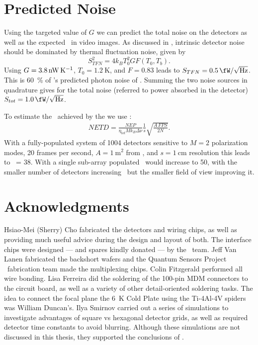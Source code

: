 \section{Predicted Noise} \label{sec:ch5-predicted-noise}

Using the targeted value of $G$ we can predict the total noise on the detectors as well as the expected \NETD\ in video images.
As discussed in , intrinsic detector noise should be dominated by thermal fluctuation noise, given by
\begin{equation}
  S^2_{TFN} = 4 k_B T_0^2 G F(T_0, T_b).
\end{equation}
Using $G = \SI{3.8}{\nW\per\K}$, $T_0 = \SI{1.2}{\K}$, and $F = 0.83$ leads to $S_{TFN} = \Pnoisef{0.5}$.
This is \SI{60}{\percent} of 's predicted photon noise of .
Summing the two noise sources in quadrature gives for the total noise (referred to power absorbed in the detector) $S_{tot} = \Pnoisef{1.0}$.

To estimate the \NETD\ achieved by the \Imager we use :
\begin{align}
  NETD = \frac{NEP}{\eta_{tot} M k_B \Delta \nu} \frac{1}{s} \sqrt{\frac{A\,FPS}{2 N}} .
\end{align}
With a fully-populated system of 1004 detectors sensitive to $M=2$ polarization modes, 20 frames per second, $A = \SI{1}{\m^2}$ from , and $ s = \SI{1}{\cm}$ resolution this leads to \NETD\ = \SI{38}{\mK}.
With a single sub-array populated \NETD\ would increase to \SI{50}{\mK}, with the smaller number of detectors increasing \NETD\ but the smaller field of view improving it. 

\section{Acknowledgments}

Hsiao-Mei (Sherry) Cho fabricated the detectors and wiring chips, as well as providing much useful advice during the design and layout of both.
The interface chips were designed --- and spares kindly donated --- by the \ABS\ team.
Jeff Van Lanen fabricated the backshort wafers and the Quantum Sensors Project \SQUID\ fabrication team made the multiplexing chips.
Colin Fitzgerald performed all wire bonding.
Lisa Ferreira did the soldering of the 100-pin MDM connectors to the circuit board, as well as a variety of other detail-oriented soldering tasks.
The idea to connect the focal plane the \SI{6}{\K} Cold Plate using the Ti-4Al-4V spiders was William Duncan's.
Ilya Smirnov carried out a series of simulations to investigate advantages of square vs hexagonal detector grids, as well as required detector time constants to avoid blurring.
Although these simulations are not discussed in this thesis, they supported the conclusions of .
